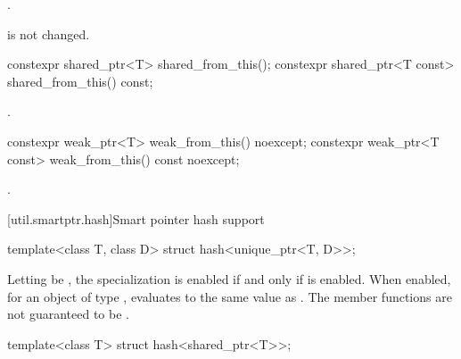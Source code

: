 \begin{itemdescr}
\pnum
\returns
{}.

\pnum
\begin{note}
 is not changed.
\end{note}
\end{itemdescr}

%
%
\begin{itemdecl}
constexpr shared_ptr<T>       shared_from_this();
constexpr shared_ptr<T const> shared_from_this() const;
\end{itemdecl}

\begin{itemdescr}
\pnum
\returns
{}.
\end{itemdescr}

%
%
\begin{itemdecl}
constexpr weak_ptr<T>       weak_from_this() noexcept;
constexpr weak_ptr<T const> weak_from_this() const noexcept;
\end{itemdecl}

\begin{itemdescr}
\pnum
\returns
{}.
\end{itemdescr}

[util.smartptr.hash]{Smart pointer hash support}

%
\begin{itemdecl}
template<class T, class D> struct hash<unique_ptr<T, D>>;
\end{itemdecl}

\begin{itemdescr}
\pnum
Letting  be ,
the specialization  is enabled
if and only if  is enabled.
When enabled, for an object  of type ,
 evaluates to
the same value as .
The member functions are not guaranteed to be .
\end{itemdescr}

%
\begin{itemdecl}
template<class T> struct hash<shared_ptr<T>>;
\end{itemdecl}

